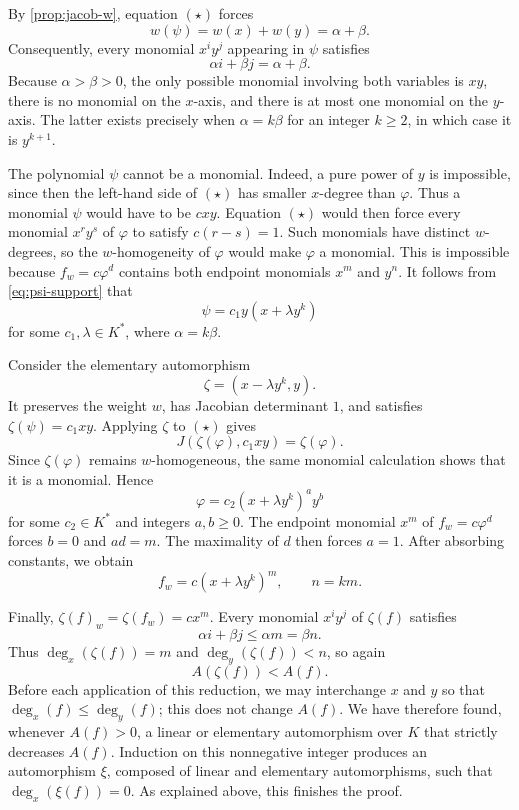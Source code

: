 \documentclass[a4paper,10pt]{amsart}
\begin{document}
By \cref{prop:jacob-w}, equation \((\star)\) forces
\[w(\psi)=w(x)+w(y)=\alpha+\beta.\]
Consequently, every monomial \(x^iy^j\) appearing in \(\psi\) satisfies
\begin{equation}\label{eq:psi-support}
  \alpha i+\beta j=\alpha+\beta.
\end{equation}
Because \(\alpha>\beta>0\), the only possible monomial involving both variables is \(xy\), there is no monomial on the \(x\)-axis, and there is at most one monomial on the \(y\)-axis. The latter exists precisely when \(\alpha=k\beta\) for an integer \(k\ge 2\), in which case it is \(y^{k+1}\).

The polynomial \(\psi\) cannot be a monomial. Indeed, a pure power of \(y\) is impossible, since then the left-hand side of \((\star)\) has smaller \(x\)-degree than \(\varphi\). Thus a monomial \(\psi\) would have to be \(cxy\). Equation \((\star)\) would then force every monomial \(x^ry^s\) of \(\varphi\) to satisfy \(c(r-s)=1\). Such monomials have distinct \(w\)-degrees, so the \(w\)-homogeneity of \(\varphi\) would make \(\varphi\) a monomial. This is impossible because \(f_w=c\varphi^d\) contains both endpoint monomials \(x^m\) and \(y^n\). It follows from \eqref{eq:psi-support} that
\[\psi=c_1y(x+\lambda y^k)\]
for some \(c_1,\lambda\in K^*\), where \(\alpha=k\beta\).

Consider the elementary automorphism
\[\zeta=(x-\lambda y^k,y).\]
It preserves the weight \(w\), has Jacobian determinant \(1\), and satisfies \(\zeta(\psi)=c_1xy\). Applying \(\zeta\) to \((\star)\) gives
\[J(\zeta(\varphi),c_1xy)=\zeta(\varphi).\]
Since \(\zeta(\varphi)\) remains \(w\)-homogeneous, the same monomial calculation shows that it is a monomial. Hence
\[\varphi=c_2(x+\lambda y^k)^a y^b\]
for some \(c_2\in K^*\) and integers \(a,b\ge 0\). The endpoint monomial \(x^m\) of \(f_w=c\varphi^d\) forces \(b=0\) and \(ad=m\). The maximality of \(d\) then forces \(a=1\). After absorbing constants, we obtain
\[f_w=c(x+\lambda y^k)^m,\qquad n=km.\]

Finally, \(\zeta(f)_w=\zeta(f_w)=cx^m\). Every monomial \(x^iy^j\) of \(\zeta(f)\) satisfies
\[\alpha i+\beta j\le \alpha m=\beta n.\]
Thus \(\deg_x(\zeta(f))=m\) and \(\deg_y(\zeta(f))<n\), so again
\[A(\zeta(f))<A(f).\]
Before each application of this reduction, we may interchange \(x\) and \(y\) so that \(\deg_x(f)\le \deg_y(f)\); this does not change \(A(f)\). We have therefore found, whenever \(A(f)>0\), a linear or elementary automorphism over \(K\) that strictly decreases \(A(f)\). Induction on this nonnegative integer produces an automorphism \(\xi\), composed of linear and elementary automorphisms, such that \(\deg_x(\xi(f))=0\). As explained above, this finishes the proof.

\printbibliography
\end{document}
